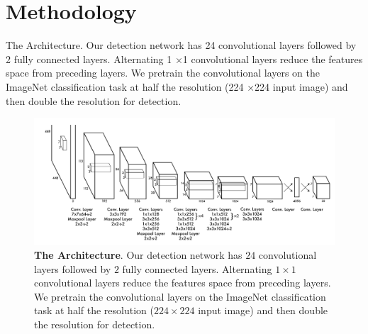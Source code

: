 \chapter[Methodology]{Methodology}

\regularsection
\headerregularsection

\updatemylof %
\updatemylot %

\begin{sloppypar} %

The Architecture. Our detection network has 24 convolutional layers followed by 2 fully connected layers. Alternating 1 ×1 convolutional layers reduce the features space from preceding layers. We pretrain the convolutional layers on the ImageNet classification task at half the resolution (224 ×224 input image) and then double the resolution for detection.

\end{sloppypar}

\begin{figure}[H] %
    \centering
    \includegraphics[width=\textwidth]{figures/paper/layers.png}
    \caption[The Architecture]{\textbf{The Architecture}. Our detection network has $24$ convolutional layers followed by $2$ fully connected layers. Alternating $1 \times 1$ convolutional layers reduce the features space from preceding layers. We pretrain the convolutional layers on the ImageNet classification task at half the resolution ($224 \times 224$ input image) and then double the resolution for detection.}
    \label{fig:figures/paper-iv/fig-3}
\end{figure}

